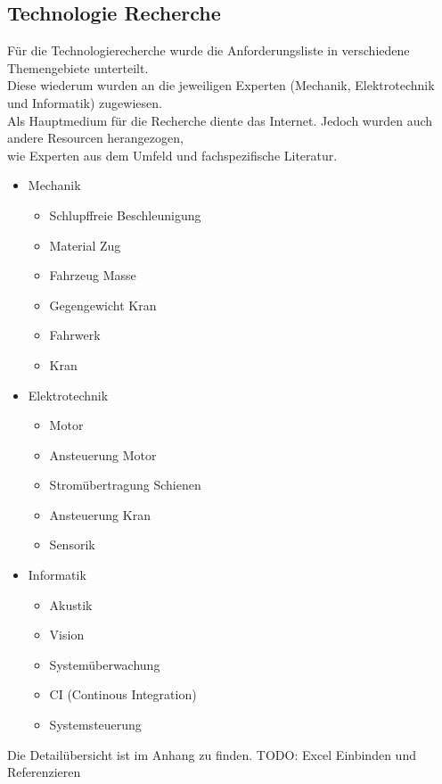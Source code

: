 \documentclass[../../main.tex]{subfiles}
\begin{document}
\subsection{Technologie Recherche}
Für die Technologierecherche wurde die Anforderungsliste in verschiedene Themengebiete unterteilt. \\
Diese wiederum wurden an die jeweiligen Experten (Mechanik, Elektrotechnik und Informatik) zugewiesen. \\
Als Hauptmedium für die Recherche diente das Internet. Jedoch wurden auch andere Resourcen herangezogen, \\
wie Experten aus dem Umfeld und fachspezifische Literatur.

\begin{itemize}
    \item Mechanik
    \begin{itemize}
        \item Schlupffreie Beschleunigung
        \item Material Zug
        \item Fahrzeug Masse
        \item Gegengewicht Kran
        \item Fahrwerk
        \item Kran
    \end{itemize}
    \item Elektrotechnik
    \begin{itemize}
        \item Motor
        \item Ansteuerung Motor
        \item Stromübertragung Schienen
        \item Ansteuerung Kran
        \item Sensorik
      \end{itemize}
    \item Informatik
    \begin{itemize}
        \item Akustik
        \item Vision
        \item Systemüberwachung
        \item CI (Continous Integration)
        \item Systemsteuerung
    \end{itemize}
\end{itemize}


Die Detailübersicht ist im Anhang zu finden. TODO: Excel Einbinden und Referenzieren
\end{document}
